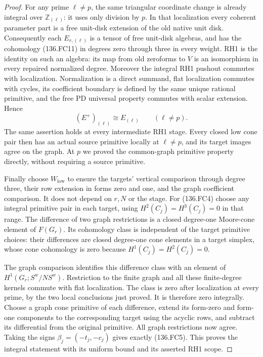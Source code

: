 \begin{proof}
For any prime \(\ell\ne p\), the same triangular coordinate
change is already integral over \(\mathbb Z_{(\ell)}\):
it uses only division by \(p\). In that localization every
coherent parameter part is a free unit-disk extension of the old
native unit disk. Consequently each \(E_{r,(\ell)}\) is
a tensor of free unit-disk algebras, and has the cohomology
(136.FC11) in degrees zero through three in every weight.
RH1 is the identity on such an algebra: its map from old zeroforms
to \(V\) is an isomorphism in every repaired normalized degree.
Moreover the integral RH1 pushout commutes with localization.
Normalization is a direct summand, flat localization commutes
with cycles, its coefficient boundary is defined by the same
unique rational primitive, and the free PD universal property
commutes with scalar extension. Hence
\[
                     (E^+)_{(\ell)}\cong E_{(\ell)}
                             \qquad(\ell\ne p).         \tag{136.FC16}
\]
The same assertion holds at every intermediate RH1 stage.
Every closed low cone pair then has an actual source primitive
locally at \(\ell\ne p\), and its target images agree on
the graph. At \(p\) we proved the common-graph primitive
property directly, without requiring a source primitive.

Finally choose \(W_{\mathrm{low}}\) to ensure the targets'
vertical comparison through degree three, their row extension
in forms zero and one, and the graph coefficient comparison.
It does not depend on \(r,N\) or the stage. For (136.FC4)
choose any integral primitive pair in each target, using
\(H^2(C_j)=H^3(C_j)=0\) in that range. The difference of
two graph restrictions is a closed degree-one Moore-cone element
of \(F(G_r)\). Its cohomology class is independent of the
target primitive choices: their differences are closed degree-one
cone elements in a target simplex, whose cone cohomology is zero
because \(H^1(C_j)=H^2(C_j)=0\).

The graph comparison identifies this difference class with an
element of \(H^1(G_r;S^w/NS^w)\). Restriction to the finite
graph and all these finite-degree kernels commute with flat
localization. The class is zero after localization at every prime,
by the two local conclusions just proved. It is therefore zero
integrally. Choose a graph cone primitive of each difference,
extend its form-zero and form-one components to the corresponding
target using the acyclic rows, and subtract its differential from
the original primitive. All graph restrictions now agree.
Taking the signs \(\beta_j=(-t_j,-c_j)\) gives exactly
(136.FC5). This proves the integral statement with its uniform
bound and its asserted RH1 scope.
\end{proof}


